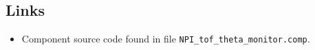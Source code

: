 \subsection*{Links}
\begin{itemize}
  \item Component source code found in file \texttt{NPI\_tof\_theta\_monitor.comp}.
\end{itemize}
